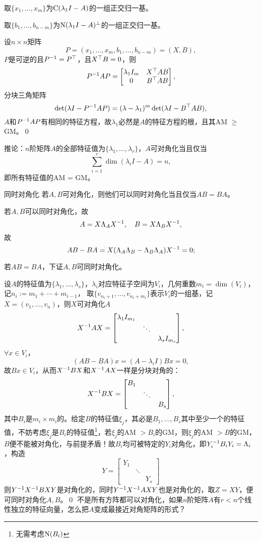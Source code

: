 取$\{x_1,\ldots,x_m\}$为$\operatorname{C}(\lambda_1I-A)$的一组正交归一基。

取$\{b_1,\ldots,b_{n-m}\}$为$\operatorname{N}(\lambda_1I-A)^\perp$的一组正交归一基。

设$n\times n$矩阵 
\[
	P=(x_1,\ldots,x_m,b_1,\ldots,b_{n-m})=(X,B),
\]
$P$是可逆的且$P^{-1}=P^\top$，且$X^\top B=0$，则 
\[
	P^{-1} AP=\begin{bmatrix}
		\lambda_1I_m&X^\top AB\\0&B^\top AB
	\end{bmatrix},
\]
分块三角矩阵
\[
	\det(\lambda I-P^{-1} AP)=(\lambda-\lambda_1)^m\det(\lambda I-B^\top AB),
\]
$A$和$P^{-1} AP$有相同的特征方程，故$\lambda_1$必然是$A$的特征方程的根，且其AM $\geqslant$ GM。\qed

推论：$n$阶矩阵$A$的全部特征值为$\{\lambda_1,\ldots,\lambda_r\}$，$A$可对角化当且仅当
\[
	\sum_{i=1}^r\dim(\lambda_iI-A)=n,
\]
即所有特征值的AM = GM。
\begin{theorem}{同时对角化}{}
	若$A,B$可对角化，则他们可以同时对角化当且仅当$AB=BA$。
\end{theorem}
\prf 若$A,B$可以同时对角化，故
\[
	A=X\Lambda_AX^{-1},\quad B=X\Lambda_BX^{-1},
\]
故
\[
	AB-BA=X(\Lambda_A\Lambda_B-\Lambda_B\Lambda_A)X^{-1}=0;
\]

若$AB=BA$，下证$A,B$可同时对角化。

设$A$的特征值为$\{\lambda_1,\ldots,\lambda_s\}$，$\lambda_i$对应特征子空间为$V_i$，几何重数$m_i=\dim(V_i)$，%
记$n_i:=m_1+\cdots+m_{i-1}$，
取$\{v_{n_i+1},\ldots,v_{n_i+m_i}\}$表示$V_i$的一组基，记$X=(v_1,\ldots,v_n)$，则$X$可对角化$A$
\[
	X^{-1} AX=\begin{bmatrix}
		\lambda_1I_{m_1}\\ &\ddots\\ &&\lambda_sI_{m_s}
	\end{bmatrix},
\]
$\forall x\in V_i$，
\[
	(AB-BA)x=(A-\lambda_iI)Bx=0,
\]
故$Bx\in V_i$，从而$X^{-1} BX$和$X^{-1} AX$一样是分块对角的：
\[
	X^{-1} BX=\begin{bmatrix}
		B_1\\ &\ddots\\ &&B_s
	\end{bmatrix},
\]
其中$B_i$是$m_i\times m_i$的。给定$B$的特征值$\xi_j$，其必是$B_1,\ldots,B_s$其中至少一个的特征值，不妨考虑$\xi_j$是$B_i$的特征值\footnote{无需考虑$\operatorname{N}(B_i)$}，若$\xi_j$的AM $>B_i$的GM，则$\xi_j$的AM $>B$的GM，$B$便不能被对角化，与前提矛盾！故$B_i$均可被特定的$Y_i$对角化，即$Y_i^{-1} B_iY_i=\Lambda_i$，构造
\[
	Y=\begin{bmatrix}
		Y_1\\ &\ddots\\ &&Y_s
	\end{bmatrix}
\]
则$Y^{-1} X^{-1} BXY$是对角化的，同时$Y^{-1} X^{-1} AXY$也是对角化的，取$Z=XY$，便可同时对角化$A,B$。\qed
{}
不是所有方阵都可以对角化，如果$n$阶矩阵$A$有$r<n$个线性独立的特征向量，怎么把$A$变成最接近对角矩阵的形式？

